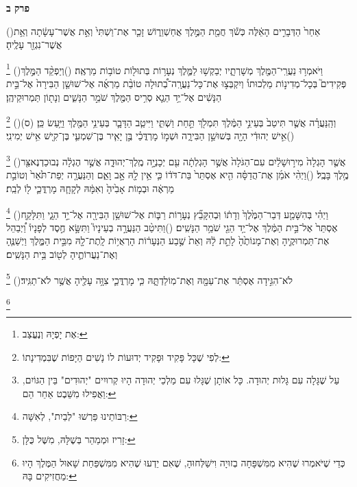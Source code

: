 \documentclass[12pt, openany]{book}
\newcommand{\chapname}{}
\newcommand{\newchap}[1]{
	\addcontentsline{toc}{chapter}{#1}
	\renewcommand{\chapname}{#1}
		\begin{center}
			\textbf{%
\fontsize{16pt}{16pt}\selectfont
				#1}
		\end{center}
}
\newcommand{\footnotecomment}[1]{
	\renewcommand\thefootnote{}
	\footnote{\textsf{#1}}}
\newcommand{\commenta}[1]{\footnotecomment{#1}\hspace{0em}}
\newcommand{\vsnum}[1]{(\hebrewnumeral{#1})\space}
\begin{document}
\newchap{פרק ב}
\begin{multicols}{2}
\vsnum{1}אַחַר֙ הַדְּבָרִ֣ים הָאֵ֔לֶּה כְּשֹׁ֕ךְ חֲמַ֖ת הַמֶּ֣לֶךְ אֲחַשְׁוֵר֑וֹשׁ זָכַ֤ר אֶת־וַשְׁתִּי֙ וְאֵ֣ת אֲשֶׁר־עָשָׂ֔תָה וְאֵ֥ת אֲשֶׁר־נִגְזַ֖ר עָלֶֽיהָ׃%
\commenta{ אֶת יָפְיָהּ וְנֶעֱצַב:}%
\vsnum{2}וַיֹּאמְר֥וּ נַעֲרֵֽי־הַמֶּ֖לֶךְ מְשָׁרְתָ֑יו יְבַקְשׁ֥וּ לַמֶּ֛לֶךְ נְעָר֥וֹת בְּתוּל֖וֹת טוֹב֥וֹת מַרְאֶֽה׃
\vsnum{3}וְיַפְקֵ֨ד הַמֶּ֣לֶךְ פְּקִידִים֮ בְּכָל־מְדִינ֣וֹת מַלְכוּתוֹ֒ וְיִקְבְּצ֣וּ אֶת־כָּל־נַעֲרָֽה־בְ֠תוּלָה טוֹבַ֨ת מַרְאֶ֜ה אֶל־שׁוּשַׁ֤ן הַבִּירָה֙ אֶל־בֵּ֣ית הַנָּשִׁ֔ים אֶל־יַ֥ד הֵגֶ֛א סְרִ֥יס הַמֶּ֖לֶךְ שֹׁמֵ֣ר הַנָּשִׁ֑ים וְנָת֖וֹן תַּמְרוּקֵיהֶֽן׃%
\commenta{ לְפִי שֶׁכָּל פָּקִיד וּפָקִיד יְדוּעוֹת לוֹ נָשִׁים הַיָּפוֹת שֶׁבִּמְדִינָתוֹ:}%
\vsnum{4}וְהַֽנַּעֲרָ֗ה אֲשֶׁ֤ר תִּיטַב֙ בְּעֵינֵ֣י הַמֶּ֔לֶךְ תִּמְלֹ֖ךְ תַּ֣חַת וַשְׁתִּ֑י וַיִּיטַ֧ב הַדָּבָ֛ר בְּעֵינֵ֥י הַמֶּ֖לֶךְ וַיַּ֥עַשׂ כֵּֽן׃ (ס)
\vsnum{5}אִ֣ישׁ יְהוּדִ֔י הָיָ֖ה בְּשׁוּשַׁ֣ן הַבִּירָ֑ה וּשְׁמ֣וֹ מָרְדֳּכַ֗י בֶּ֣ן יָאִ֧יר בֶּן־שִׁמְעִ֛י בֶּן־קִ֖ישׁ אִ֥ישׁ יְמִינִֽי׃%
\commenta{ עַל שֶׁגָּלָה עִם גָּלוּת יְהוּדָה. כָּל אוֹתָן שֶׁגָּלוּ עִם מַלְכֵי יְהוּדָה הָיוּ קְרוּיִים "יְהוּדִים" בֵּין הַגּוֹיִם, וַאֲפִילוּ מִשֵּׁבֶט אַחֵר הֵם: }%
\vsnum{6}אֲשֶׁ֤ר הָגְלָה֙ מִיר֣וּשָׁלַ֔יִם עִם־הַגֹּלָה֙ אֲשֶׁ֣ר הָגְלְתָ֔ה עִ֖ם יְכָנְיָ֣ה מֶֽלֶךְ־יְהוּדָ֑ה אֲשֶׁ֣ר הֶגְלָ֔ה נְבוּכַדְנֶאצַּ֖ר מֶ֥לֶךְ בָּבֶֽל׃
\vsnum{7}וַיְהִ֨י אֹמֵ֜ן אֶת־הֲדַסָּ֗ה הִ֤יא אֶסְתֵּר֙ בַּת־דֹּד֔וֹ כִּ֛י אֵ֥ין לָ֖הּ אָ֣ב וָאֵ֑ם וְהַנַּעֲרָ֤ה יְפַת־תֹּ֙אַר֙ וְטוֹבַ֣ת מַרְאֶ֔ה וּבְמ֤וֹת אָבִ֙יהָ֙ וְאִמָּ֔הּ לְקָחָ֧הּ מָרְדֳּכַ֛י ל֖וֹ לְבַֽת׃%
\commenta{ רַבּוֹתֵינוּ פֵּרְשׁוּ "לְבַיִת", לְאִשָּׁה: }%
\vsnum{8}וַיְהִ֗י בְּהִשָּׁמַ֤ע דְּבַר־הַמֶּ֙לֶךְ֙ וְדָת֔וֹ וּֽבְהִקָּבֵ֞ץ נְעָר֥וֹת רַבּ֛וֹת אֶל־שׁוּשַׁ֥ן הַבִּירָ֖ה אֶל־יַ֣ד הֵגָ֑י וַתִּלָּקַ֤ח אֶסְתֵּר֙ אֶל־בֵּ֣ית הַמֶּ֔לֶךְ אֶל־יַ֥ד הֵגַ֖י שֹׁמֵ֥ר הַנָּשִֽׁים׃
\vsnum{9}וַתִּיטַ֨ב הַנַּעֲרָ֣ה בְעֵינָיו֮ וַתִּשָּׂ֣א חֶ֣סֶד לְפָנָיו֒ וַ֠יְבַהֵל אֶת־תַּמְרוּקֶ֤יהָ וְאֶת־מָנוֹתֶ֙הָ֙ לָתֵ֣ת לָ֔הּ וְאֵת֙ שֶׁ֣בַע הַנְּעָר֔וֹת הָרְאֻי֥וֹת לָֽתֶת־לָ֖הּ מִבֵּ֣ית הַמֶּ֑לֶךְ וַיְשַׁנֶּ֧הָ וְאֶת־נַעֲרוֹתֶ֛יהָ לְט֖וֹב בֵּ֥ית הַנָּשִֽׁים׃%
\commenta{ זָרִיז וּמְמַהֵר בְּשֶׁלָּהּ, מִשֶּׁל כֻּלָּן: }%
\vsnum{10}לֹא־הִגִּ֣ידָה אֶסְתֵּ֔ר אֶת־עַמָּ֖הּ וְאֶת־מֽוֹלַדְתָּ֑הּ כִּ֧י מָרְדֳּכַ֛י צִוָּ֥ה עָלֶ֖יהָ אֲשֶׁ֥ר לֹא־תַגִּֽיד׃%
\commenta{ כְּדֵי שֶׁיֹּאמְרוּ שֶׁהִיא מִמִּשְׁפָּחָה בְזוּיָה וִישַׁלְּחוּהָ, שֶׁאִם יֵדְעוּ שֶׁהִיא מִמִּשְׁפַּחַת שָׁאוּל הַמֶּלֶךְ הָיוּ מַחֲזִיקִים בָּהּ: }%

\end{multicols}
\end{document}

